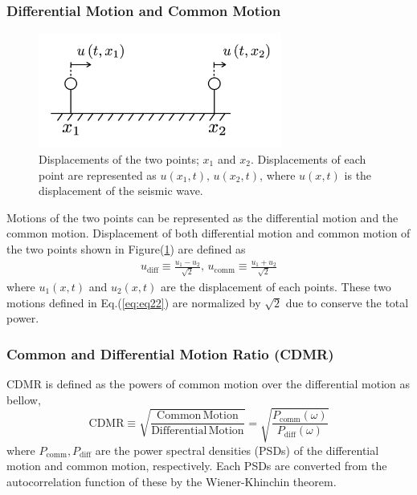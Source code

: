 \subsubsection{Differential Motion and Common Motion}
\begin{figure}[H]
  \begin{center}
    \includegraphics[width=8.0cm]{./img_chap3/chap310.png}
  \end{center}
  \caption{Displacements of the two points; $x_1$ and $x_2$. Displacements of each point are represented as $u(x_1,t),\, u(x_2,t)$, where $u(x,t)$ is the displacement of the seismic wave.} \label{img:img_chap310}
\end{figure}

Motions of the two points can be represented as the differential motion and the common motion. Displacement of both differential motion and common motion of the two points shown in Figure(\ref{img:img_chap310}) are defined as
\begin{eqnarray}\label{eq:eq22}
  u_{\mathrm{diff}} \equiv \frac{u_{1}-u_{2}}{\sqrt{2}}, \,
  u_{\mathrm{comm}}  \equiv \frac{u_{1}+u_{2}}{\sqrt{2}}
\end{eqnarray}
where $u_{1}(x,t)$ and $u_2(x,t)$ are the displacement of each points. These two motions defined in Eq.(\ref{eq:eq22}) are normalized by $\sqrt{2}$ due to conserve the total power.


\subsubsection{Common and Differential Motion Ratio (CDMR)}
CDMR is defined as the powers of common motion over the differential motion as bellow,
\begin{equation}
  \mathrm{CDMR} \equiv \sqrt{\frac{\mathrm{Common\,Motion}}{\mathrm{Differential\,Motion}}} = \sqrt{\frac{P_{\mathrm{comm}}(\omega)}{P_{\mathrm{diff}}(\omega)}} \label{eq:eq23}
\end{equation}
where $P_{\mathrm{comm}},P_{\mathrm{diff}}$ are the power spectral densities (PSDs) of the differential motion and common motion, respectively. Each PSDs are converted from the autocorrelation function of these by the Wiener-Khinchin theorem.

